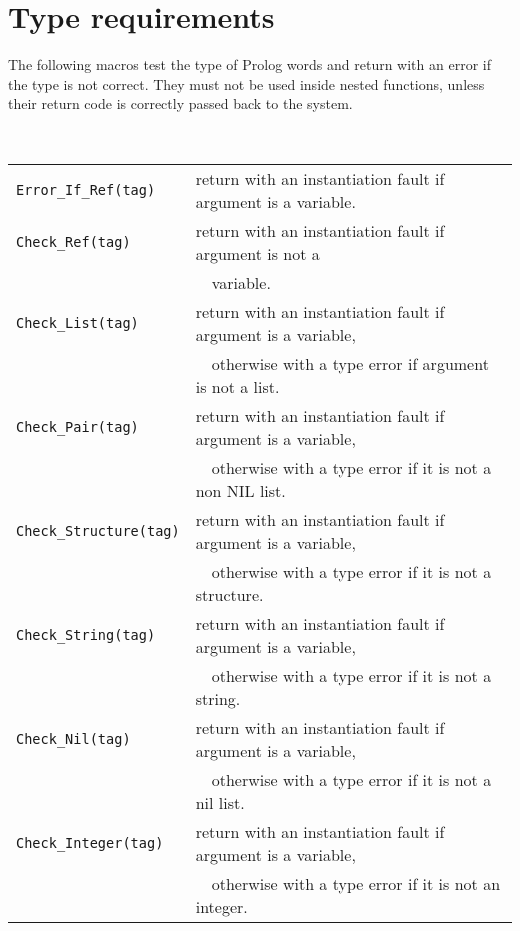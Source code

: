 \newpage

\section{Type requirements}
The following macros test the type of Prolog words and return
with an error if the type is not correct.
They must not be used inside nested functions, unless their
return code is correctly passed back to the system.

\noindent
 \\
\begin{tabular}{|ll|} 
\hline
{\tt Error_If_Ref(tag)} & 
return with an instantiation fault if argument is a variable. \\

{\tt Check_Ref(tag)} & 
return with an instantiation fault if argument is not a \\
& \ \ variable. \\

{\tt Check_List(tag)} & 
return with an instantiation fault if argument is a variable, \\
& \ \ otherwise with a type error if argument is not a list. \\

{\tt Check_Pair(tag)} & 
return with an instantiation fault if argument is a variable, \\
& \ \ otherwise with a type error if it is not a non NIL list. \\

{\tt Check_Structure(tag)} & 
return with an instantiation fault if argument is a variable, \\
& \ \ otherwise with a type error if it is not a structure. \\

{\tt Check_String(tag)} & 
return with an instantiation fault if argument is a variable, \\
& \ \ otherwise with a type error if it is not a string. \\

{\tt Check_Nil(tag)} & 
return with an instantiation fault if argument is a variable, \\
& \ \ otherwise with a type error if it is not a nil list. \\

{\tt Check_Integer(tag)} & 
return with an instantiation fault if argument is a variable, \\
& \ \ otherwise with a type error if it is not an integer. \\


\end{tabular}

